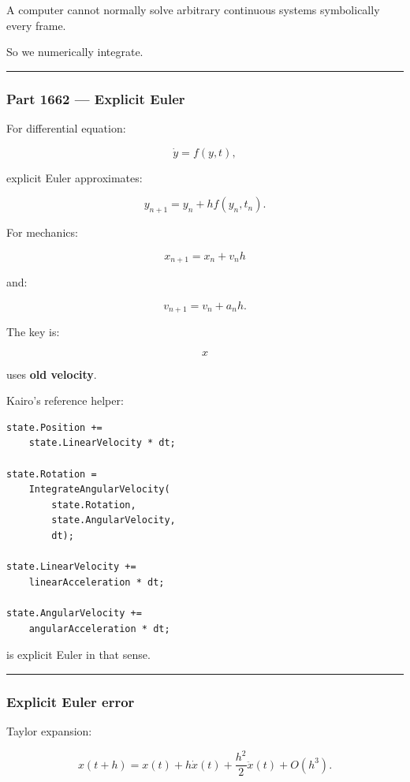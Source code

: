 A computer cannot normally solve arbitrary continuous systems symbolically every frame.

So we numerically integrate.

\begin{center}\rule{0.5\linewidth}{0.5pt}\end{center}

\subsubsection{Part 1662 --- Explicit Euler}\label{part-1662-explicit-euler}

For differential equation:

\[
\dot y=f(y,t),
\]

explicit Euler approximates:

\[
\boxed{
y_{n+1}
=
y_n+
h f(y_n,t_n).
}
\]

For mechanics:

\[
x_{n+1}
=
x_n+
v_nh
\]

and:

\[
v_{n+1}
=
v_n+
a_nh.
\]

The key is:

\[
x
\]

uses \textbf{old velocity}.

Kairo's reference helper:

\begin{verbatim}
state.Position +=
    state.LinearVelocity * dt;

state.Rotation =
    IntegrateAngularVelocity(
        state.Rotation,
        state.AngularVelocity,
        dt);

state.LinearVelocity +=
    linearAcceleration * dt;

state.AngularVelocity +=
    angularAcceleration * dt;
\end{verbatim}

is explicit Euler in that sense.

\begin{center}\rule{0.5\linewidth}{0.5pt}\end{center}

\subsubsection{Explicit Euler error}\label{explicit-euler-error}

Taylor expansion:

\[
x(t+h)
=
x(t)
+
h\dot x(t)
+
\frac{h^2}{2}\ddot x(t)
+
O(h^3).
\]

